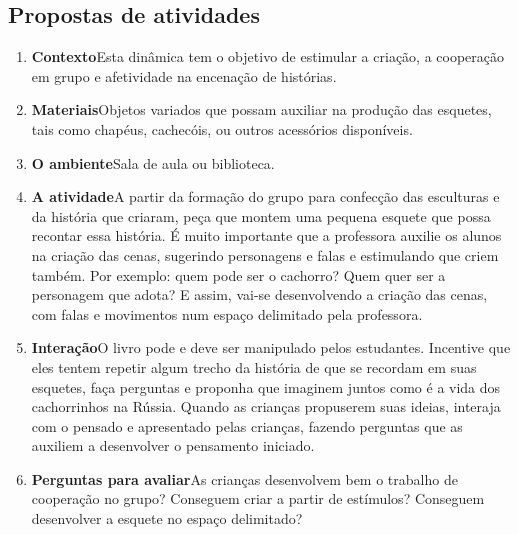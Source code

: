\documentclass[11pt]{extarticle}
\begin{document}
\subsection{Propostas de atividades}



\begin{enumerate}
\item \textbf{Contexto}\quad Esta dinâmica tem o objetivo de estimular a criação, a cooperação em grupo e afetividade na encenação de histórias.

\item \textbf{Materiais}\quad Objetos variados que possam auxiliar na produção das esquetes, tais como chapéus, cachecóis, ou outros acessórios disponíveis. 

\item \textbf{O ambiente}\quad Sala de aula ou biblioteca. 

\item \textbf{A atividade}\quad A partir da formação do grupo para confecção das esculturas e da história que criaram, peça que montem uma pequena esquete que possa recontar essa história. É muito importante que a professora auxilie os alunos na criação das cenas, sugerindo personagens e falas e estimulando que criem também. Por exemplo: quem pode ser o cachorro? Quem quer ser a personagem que adota? E assim, vai-se desenvolvendo a criação das cenas, com falas e movimentos num espaço delimitado pela professora.


\item \textbf{Interação}\quad O livro pode e deve ser 
manipulado pelos estudantes. Incentive que eles tentem repetir algum trecho da história de que se recordam em suas esquetes,
faça perguntas e proponha que imaginem juntos como é a vida 
dos cachorrinhos na Rússia. Quando as crianças propuserem suas ideias, interaja com o pensado e apresentado pelas crianças, fazendo perguntas que as auxiliem a desenvolver o pensamento iniciado.

\item \textbf{Perguntas para avaliar}\quad As crianças desenvolvem bem o trabalho de cooperação no grupo? Conseguem criar a partir de estímulos? Conseguem desenvolver a esquete no espaço delimitado?
\end{enumerate}
\end{document}
